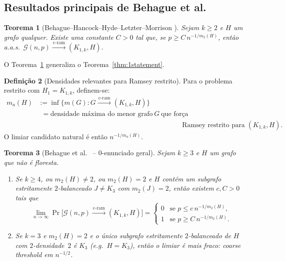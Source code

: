 \documentclass[reqno, 12pt]{amsart}
\numberwithin{equation}{section}
\theoremstyle{plain}
\newtheorem{theorem}{Teorema}[section]
\theoremstyle{definition}
\newtheorem{definition}[theorem]{Definição}
\newcommand{\Gnp}{\mathcal{G}(n,p)}
\newcommand{\cram}{\xrightarrow{\,\mathrm{c\text{-}ram}\,}}
\newcommand{\mdens}{m_2}
\newcommand{\maxdens}{m}
\newcommand{\whp}{a.a.s.}
\begin{document}
\subsection{Resultados principais de Behague et al.}

\begin{theorem}[Behague--Hancock--Hyde--Letzter--Morrison \cite{behague2025thresholds}]
\label{thm:behague-1-stmt}
Sejam $k \ge 2$ e $H$ um grafo qualquer.
Existe uma constante $C > 0$ tal que, se $p \ge C\, n^{-1/\mdens(H)}$, então
\whp\ $\Gnp \cram (K_{1,k}, H)$.
\end{theorem}

O Teorema~\ref{thm:behague-1-stmt} generaliza o Teorema~\ref{thm:1statement}.

\begin{definition}[Densidades relevantes para Ramsey restrito]
Para o problema restrito com $H_1 = K_{1,k}$, definem-se:
\begin{align*}
  m_a(H) &:= \inf\!\bigl\{\maxdens(G) : G \cram (K_{1,k}, H)\bigr\}\\
         &\phantom{:}= \text{densidade máxima do menor grafo} \ G\ \text{que força }\\
         &\phantom{= \text{densidade máxima do menor grafo} G \text{que força}} \text{Ramsey restrito para } (K_{1,k}, H).
\end{align*}
O limiar candidato natural é então $n^{-1/m_a(H)}$.
\end{definition}

\begin{theorem}[Behague et al.\ \cite{behague2025thresholds} -- $0$-enunciado geral]
\label{thm:behague-0-stmt}
Sejam $k \ge 3$ e $H$ um grafo que não é floresta.
\begin{enumerate}
  \item[(a)] Se $k \ge 4$, \emph{ou} $\mdens(H) \ne 2$, \emph{ou}
    $\mdens(H) = 2$ e $H$ contém um subgrafo estritamente $2$-balanceado
    $J \ne K_3$ com $\mdens(J) = 2$,
    então existem $c, C > 0$ tais que
    \[
      \lim_{n\to\infty} \Pr\!\bigl[\Gnp \cram (K_{1,k}, H)\bigr] =
      \begin{cases}
        0 & \text{se } p \le c\, n^{-1/\mdens(H)},\\
        1 & \text{se } p \ge C\, n^{-1/\mdens(H)}.
      \end{cases}
    \]
  \item[(b)] Se $k = 3$ e $\mdens(H) = 2$ e o único subgrafo estritamente
    $2$-balanceado de $H$ com $2$-densidade~$2$ é $K_3$ (e.g.\ $H = K_3$),
    então o limiar é mais fraco: coarse threshold em $n^{-1/2}$.
\end{enumerate}
\end{theorem}
\end{document}
